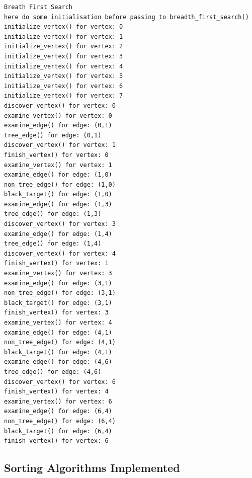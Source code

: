 \documentclass[a4paper,titlepage]{article}
\begin{document}
\begin{lstlisting}
Breath First Search
here do some initialisation before passing to breadth_first_search()
initialize_vertex() for vertex: 0
initialize_vertex() for vertex: 1
initialize_vertex() for vertex: 2
initialize_vertex() for vertex: 3
initialize_vertex() for vertex: 4
initialize_vertex() for vertex: 5
initialize_vertex() for vertex: 6
initialize_vertex() for vertex: 7
discover_vertex() for vertex: 0
examine_vertex() for vertex: 0
examine_edge() for edge: (0,1)
tree_edge() for edge: (0,1)
discover_vertex() for vertex: 1
finish_vertex() for vertex: 0
examine_vertex() for vertex: 1
examine_edge() for edge: (1,0)
non_tree_edge() for edge: (1,0)
black_target() for edge: (1,0)
examine_edge() for edge: (1,3)
tree_edge() for edge: (1,3)
discover_vertex() for vertex: 3
examine_edge() for edge: (1,4)
tree_edge() for edge: (1,4)
discover_vertex() for vertex: 4
finish_vertex() for vertex: 1
examine_vertex() for vertex: 3
examine_edge() for edge: (3,1)
non_tree_edge() for edge: (3,1)
black_target() for edge: (3,1)
finish_vertex() for vertex: 3
examine_vertex() for vertex: 4
examine_edge() for edge: (4,1)
non_tree_edge() for edge: (4,1)
black_target() for edge: (4,1)
examine_edge() for edge: (4,6)
tree_edge() for edge: (4,6)
discover_vertex() for vertex: 6
finish_vertex() for vertex: 4
examine_vertex() for vertex: 6
examine_edge() for edge: (6,4)
non_tree_edge() for edge: (6,4)
black_target() for edge: (6,4)
finish_vertex() for vertex: 6
\end{lstlisting}

\subsection{Sorting Algorithms Implemented}


\newpage
\printindex
\end{document}
